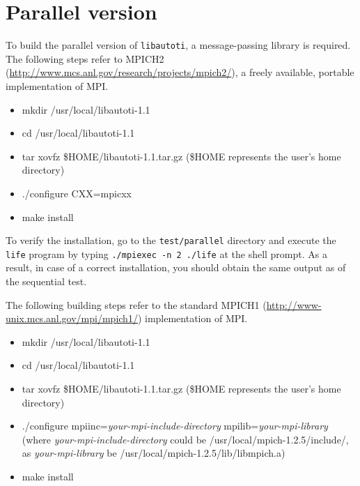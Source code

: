 \section{Parallel version}

To build the parallel version of \verb"libautoti", a
message-passing library is required. The following steps refer
to MPICH2
(\url{http://www.mcs.anl.gov/research/projects/mpich2/}), a freely
available, portable implementation of MPI.

\begin{itemize}

    \item mkdir /usr/local/libautoti-1.1

    \item cd /usr/local/libautoti-1.1

    \item tar xovfz \$HOME/libautoti-1.1.tar.gz (\$HOME
represents the user's home directory)

    \item ./configure CXX=mpicxx

    \item make install

\end{itemize}


To verify the installation, go to the \verb"test/parallel"
directory and execute the \verb"life" program by typing
\verb"./mpiexec -n 2 ./life" at the shell prompt. As a result, in
case of a correct installation, you should obtain the same output
as of the sequential test.

The following building steps refer to the standard MPICH1
(\url{http://www-unix.mcs.anl.gov/mpi/mpich1/}) implementation of
MPI.

\begin{itemize}

    \item mkdir /usr/local/libautoti-1.1

    \item cd /usr/local/libautoti-1.1

    \item tar xovfz \$HOME/libautoti-1.1.tar.gz (\$HOME
represents the user's home directory)

    \item ./configure mpiinc=\emph{your-mpi-include-directory} mpilib=\emph{your-mpi-library} (where \emph{your-mpi-include-directory} could
    be /usr/local/mpich-1.2.5/include/, as \emph{your-mpi-library} be /usr/local/mpich-1.2.5/lib/libmpich.a)

    \item make install

\end{itemize}

